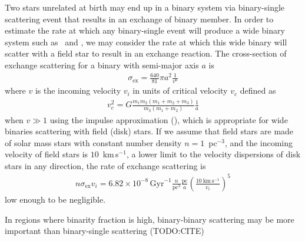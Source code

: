 \documentclass[manuscript]{aastex6}
\newcommand{\sunanalog}{\text{HD 240429}}
\newcommand{\bizarreone}{\text{HD 240430}}
\newcommand{\todo}[1]{{\color{blue}TODO:#1}}
\begin{document}
Two stars unrelated at birth may end up in a binary system via binary-single scattering event
that results in an exchange of binary member.
In order to estimate the rate at which any binary-single
event will produce a wide binary system such as \sunanalog\ and \bizarreone,
we may consider the rate at which this wide binary will scatter with a field star to
result in an exchange reaction.
The cross-section of exchange scattering for a binary with semi-major axis $a$ is
\begin{eqnarray}
  \sigma_\mathrm{ex} = \frac{640}{81} \pi a^{2} \frac{1}{v^6}
\end{eqnarray}
where $v$ is the incoming velocity $v_i$ in units of critical velocity $v_c$ defined as
\begin{eqnarray}
  v_c^2 = G \frac{m_1 m_2 (m_1 + m_2 + m_3)}{m_3 (m_1 + m_2)} \frac{1}{a}
\end{eqnarray}
when $v \gg 1$ using the impulse approximation (\citealt{Hut:1983aa,Hut:1983ab}),
which is appropriate for wide binaries scattering with field (disk) stars.
If we assume that field stars are made of solar mass stars
with constant number density $n=1$~pc$^{-3}$, and the incoming velocity of field stars
is $10$~km\,s$^{-1}$, a lower limit to the velocity dispersions of disk
stars in any direction, the rate of exchange scattering is
\begin{eqnarray}
  n \sigma_\mathrm{ex} v_i = 6.82\times 10^{-8}\,\mathrm{Gyr}^{-1}
  \frac{n}{\mathrm{pc}^3} \frac{\mathrm{pc}}{a} \left(\frac{10~\mathrm{km}\,\mathrm{s}^{-1}}{v_i}\right)^5
\end{eqnarray}
low enough to be negligible.

In regions where binarity fraction is high, binary-binary scattering may be more important
than binary-single scattering (\todo{CITE})


\end{document}
